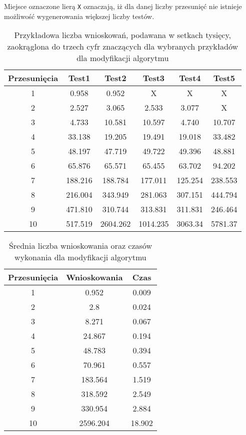     Miejsce oznaczone lierą \texttt{X} oznaczają, iż dla danej liczby przesunięć nie istnieje możliwość wygenerowania większej liczby testów.
    \begin{table}[H]
        \centering
         \begin{tabular}{||c | c | c | c | c | c |} 
         \hline
         Przesunięcia & Test1 & Test2 & Test3 & Test4 & Test5 \\ [0.5ex] 
         \hline\hline
         1 & 0.958 & 0.952 & X & X & X \\ 
         \hline
         2 & 2.527 & 3.065 & 2.533 & 3.077 & X \\
         \hline
         3 & 4.733 & 10.581 & 10.597 & 4.740 & 10.707 \\
         \hline
         4 & 33.138 & 19.205 & 19.491 & 19.018 & 33.482 \\
         \hline
         5 & 48.197 & 47.719 & 49.722 & 49.396 & 48.881\\
         \hline
         6 & 65.876 & 65.571 & 65.455 & 63.702 & 94.202\\ 
         \hline
         7 & 188.216 & 188.784 & 177.011 & 125.254 & 238.553 \\
         \hline
         8 & 216.004 & 343.949 & 281.063 & 307.151 & 444.794\\
         \hline
         9 & 471.810 & 310.744 & 313.831 & 311.831 & 246.464\\
         \hline
         10 & 517.519 & 2604.262 & 1014.235 & 3063.34 & 5781.37 \\ [1ex]
         \hline
         \end{tabular}
         \caption{Przykładowa liczba wnioskowań, podawana w setkach tysięcy, 
         zaokrąglona do trzech cyfr znaczących dla wybranych przykładów dla modyfikacji algorytmu}
    \end{table}
    \begin{table}[H]
        \centering
         \begin{tabular}{||c | c | c|} 
         \hline
         Przesunięcia & Wnioskowania & Czas \\ [0.5ex] 
         \hline\hline
         1 & 0.952 & 0.009 \\ 
         \hline
         2 & 2.8 & 0.024 \\
         \hline
         3 & 8.271 & 0.067 \\
         \hline
         4 & 24.867 &  0.194 \\
         \hline
         5 & 48.783 & 0.394 \\
         \hline
         6 & 70.961 & 0.557 \\ 
         \hline
         7 & 183.564 & 1.519 \\
         \hline
         8 & 318.592 & 2.549 \\
         \hline
         9 & 330.954 & 2.884 \\
         \hline
         10 & 2596.204 & 18.902 \\ [1ex]
         \hline
         \end{tabular}
         \caption{Średnia liczba wnioskowania oraz czasów wykonania dla modyfikacji algorytmu}
    \end{table}


